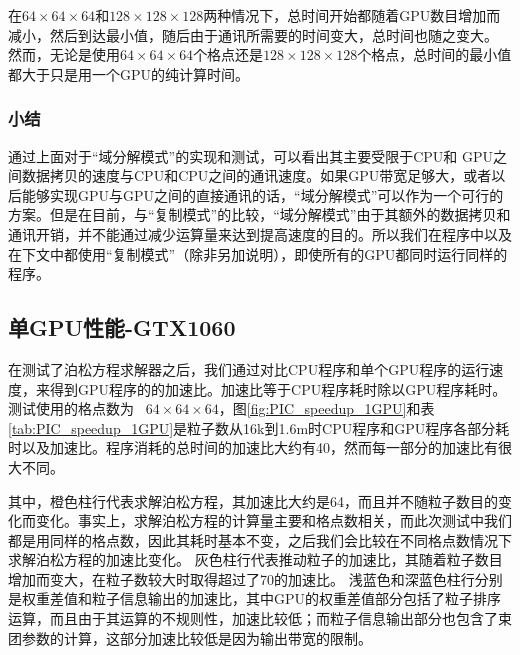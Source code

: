 在$64 \times 64 \times 64$和$128 \times 128 \times 128$两种情况下，总时间开始都随着GPU数目增加而减小，然后到达最小值，随后由于通讯所需要的时间变大，总时间也随之变大。
然而，无论是使用$64 \times 64 \times 64$个格点还是$128 \times 128 \times 128$个格点，总时间的最小值都大于只是用一个GPU的纯计算时间。
\subsubsection{小结}
通过上面对于“域分解模式”的实现和测试，可以看出其主要受限于CPU和 GPU之间数据拷贝的速度与CPU和CPU之间的通讯速度。如果GPU带宽足够大，或者以后能够实现GPU与GPU之间的直接通讯的话，“域分解模式”可以作为一个可行的方案。但是在目前，与“复制模式”的比较，“域分解模式”由于其额外的数据拷贝和通讯开销，并不能通过减少运算量来达到提高速度的目的。所以我们在程序中以及在下文中都使用“复制模式”（除非另加说明），即使所有的GPU都同时运行同样的程序。



\subsection{单GPU性能-GTX1060}
在测试了泊松方程求解器之后，我们通过对比CPU程序和单个GPU程序的运行速度，来得到GPU程序的的加速比。加速比等于CPU程序耗时除以GPU程序耗时。测试使用的格点数为~ $64 \times 64 \times 64$，图\ref{fig:PIC_speedup_1GPU}和表\ref{tab:PIC_speedup_1GPU}是粒子数从16k到1.6m时CPU程序和GPU程序各部分耗时以及加速比。程序消耗的总时间的加速比大约有40，然而每一部分的加速比有很大不同。

其中，橙色柱行代表求解泊松方程，其加速比大约是64，而且并不随粒子数目的变化而变化。事实上，求解泊松方程的计算量主要和格点数相关，而此次测试中我们都是用同样的格点数，因此其耗时基本不变，之后我们会比较在不同格点数情况下求解泊松方程的加速比变化。
灰色柱行代表推动粒子的加速比，其随着粒子数目增加而变大，在粒子数较大时取得超过了70的加速比。
浅蓝色和深蓝色柱行分别是权重差值和粒子信息输出的加速比，其中GPU的权重差值部分包括了粒子排序运算，而且由于其运算的不规则性，加速比较低；而粒子信息输出部分也包含了束团参数的计算，这部分加速比较低是因为输出带宽的限制。


